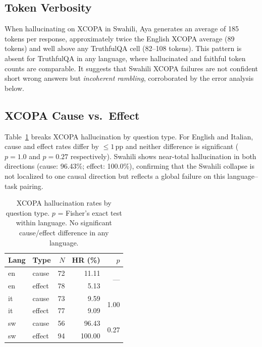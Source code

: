 \documentclass[11pt]{article}
\begin{document}
\subsection{Token Verbosity}

When hallucinating on XCOPA in Swahili, Aya generates an average of 185 tokens
per response, approximately twice the English XCOPA average (89 tokens) and
well above any TruthfulQA cell (82--108 tokens). This pattern is absent for
TruthfulQA in any language, where hallucinated and faithful token counts are
comparable. It suggests that Swahili XCOPA failures are not confident short
wrong answers but \textit{incoherent rambling}, corroborated by the error
analysis below.

\subsection{XCOPA Cause vs.\ Effect}

Table~\ref{tab:cause_effect} breaks XCOPA hallucination by question type.
For English and Italian, cause and effect rates differ by $\leq 1$\,pp and
neither difference is significant ($p=1.0$ and $p=0.27$ respectively).
Swahili shows near-total hallucination in both directions (cause: 96.43\%;
effect: 100.0\%), confirming that the Swahili collapse is not localized to
one causal direction but reflects a global failure on this language--task pairing.

\begin{table}[t]
\centering
\small
\begin{tabular}{llrrr}
\toprule
\textbf{Lang} & \textbf{Type} & \textbf{$N$} & \textbf{HR (\%)} & \textbf{$p$} \\
\midrule
en & cause  & 72 & 11.11 & \multirow{2}{*}{---} \\
en & effect & 78 &  5.13 &      \\
\midrule
it & cause  & 73 &  9.59 & \multirow{2}{*}{1.00} \\
it & effect & 77 &  9.09 &      \\
\midrule
sw & cause  & 56 & 96.43 & \multirow{2}{*}{0.27} \\
sw & effect & 94 & 100.00&      \\
\bottomrule
\end{tabular}
\caption{XCOPA hallucination rates by question type. $p$ = Fisher's exact
test within language. No significant cause/effect difference in any language.}
\label{tab:cause_effect}
\end{table}
\end{document}
